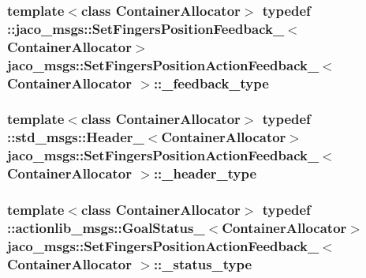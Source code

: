 \subsubsection[{\texorpdfstring{\+\_\+feedback\+\_\+type}{_feedback_type}}]{\setlength{\rightskip}{0pt plus 5cm}template$<$class Container\+Allocator$>$ typedef \+::{\bf jaco\+\_\+msgs\+::\+Set\+Fingers\+Position\+Feedback\+\_\+}$<$Container\+Allocator$>$ {\bf jaco\+\_\+msgs\+::\+Set\+Fingers\+Position\+Action\+Feedback\+\_\+}$<$ Container\+Allocator $>$\+::{\bf \+\_\+feedback\+\_\+type}}\hypertarget{structjaco__msgs_1_1SetFingersPositionActionFeedback___aa7d354a74533751bde3ebc7132f09e71}{}\label{structjaco__msgs_1_1SetFingersPositionActionFeedback___aa7d354a74533751bde3ebc7132f09e71}
\subsubsection[{\texorpdfstring{\+\_\+header\+\_\+type}{_header_type}}]{\setlength{\rightskip}{0pt plus 5cm}template$<$class Container\+Allocator$>$ typedef \+::std\+\_\+msgs\+::\+Header\+\_\+$<$Container\+Allocator$>$ {\bf jaco\+\_\+msgs\+::\+Set\+Fingers\+Position\+Action\+Feedback\+\_\+}$<$ Container\+Allocator $>$\+::{\bf \+\_\+header\+\_\+type}}\hypertarget{structjaco__msgs_1_1SetFingersPositionActionFeedback___afe617e8a3ac355e40e7b281da489d8a4}{}\label{structjaco__msgs_1_1SetFingersPositionActionFeedback___afe617e8a3ac355e40e7b281da489d8a4}
\subsubsection[{\texorpdfstring{\+\_\+status\+\_\+type}{_status_type}}]{\setlength{\rightskip}{0pt plus 5cm}template$<$class Container\+Allocator$>$ typedef \+::actionlib\+\_\+msgs\+::\+Goal\+Status\+\_\+$<$Container\+Allocator$>$ {\bf jaco\+\_\+msgs\+::\+Set\+Fingers\+Position\+Action\+Feedback\+\_\+}$<$ Container\+Allocator $>$\+::{\bf \+\_\+status\+\_\+type}}\hypertarget{structjaco__msgs_1_1SetFingersPositionActionFeedback___a7c18f9b312cacc62ecfd8aad585efacb}{}\label{structjaco__msgs_1_1SetFingersPositionActionFeedback___a7c18f9b312cacc62ecfd8aad585efacb}
